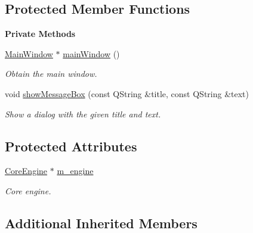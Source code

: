 \subsection*{Protected Member Functions}
\begin{Indent}\textbf{ Private Methods}\par
\begin{DoxyCompactItemize}
\item 
\mbox{\label{classrev_1_1_manager_ad485178788ef4b3abc83a8bd525311be}} 
\mbox{\hyperlink{classrev_1_1_main_window}{Main\+Window}} $\ast$ \mbox{\hyperlink{classrev_1_1_manager_ad485178788ef4b3abc83a8bd525311be}{main\+Window}} ()
\begin{DoxyCompactList}\small\item\em Obtain the main window. \end{DoxyCompactList}\item 
\mbox{\label{classrev_1_1_manager_a88aa9988893e0d186b4086e1feeb82e5}} 
void \mbox{\hyperlink{classrev_1_1_manager_a88aa9988893e0d186b4086e1feeb82e5}{show\+Message\+Box}} (const Q\+String \&title, const Q\+String \&text)
\begin{DoxyCompactList}\small\item\em Show a dialog with the given title and text. \end{DoxyCompactList}\end{DoxyCompactItemize}
\end{Indent}
\subsection*{Protected Attributes}
\begin{DoxyCompactItemize}
\item 
\mbox{\label{classrev_1_1_manager_ab7f9a3dbf9fdac6903e045e2ebbc290b}} 
\mbox{\hyperlink{classrev_1_1_core_engine}{Core\+Engine}} $\ast$ \mbox{\hyperlink{classrev_1_1_manager_ab7f9a3dbf9fdac6903e045e2ebbc290b}{m\+\_\+engine}}
\begin{DoxyCompactList}\small\item\em Core engine. \end{DoxyCompactList}\end{DoxyCompactItemize}
\subsection*{Additional Inherited Members}


